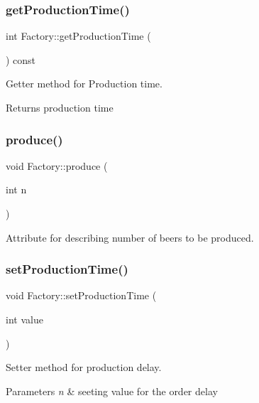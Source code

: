 \subsubsection{\texorpdfstring{get\+Production\+Time()}{getProductionTime()}}
{\footnotesize\ttfamily int Factory\+::get\+Production\+Time (\begin{DoxyParamCaption}{ }\end{DoxyParamCaption}) const}



Getter method for Production time. 

\begin{DoxyReturn}{Returns}
production time 
\end{DoxyReturn}
\mbox{\label{class_factory_a321703fafe2a870260e04b848aa565d2}} 
\subsubsection{\texorpdfstring{produce()}{produce()}}
{\footnotesize\ttfamily void Factory\+::produce (\begin{DoxyParamCaption}\item[{int}]{n }\end{DoxyParamCaption})}



Attribute for describing number of beers to be produced. 

\mbox{\label{class_factory_a8567550501860453df05d6afae963997}} 
\subsubsection{\texorpdfstring{set\+Production\+Time()}{setProductionTime()}}
{\footnotesize\ttfamily void Factory\+::set\+Production\+Time (\begin{DoxyParamCaption}\item[{int}]{value }\end{DoxyParamCaption})}



Setter method for production delay. 


\begin{DoxyParams}{Parameters}
{\em n} & seeting value for the order delay \\
\hline
\end{DoxyParams}


